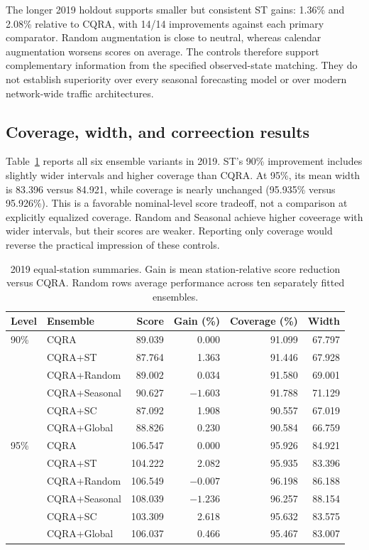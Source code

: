 \documentclass[11pt]{article}
\begin{document}
The longer 2019 holdout supports smaller but consistent ST gains: 1.36\% and 2.08\% relative to CQRA, with 14/14 improvements against each primary comparator. Random augmentation is close to neutral, whereas calendar augmentation worsens scores on average. The controls therefore support complementary information from the specified observed-state matching. They do not establish superiority over every seasonal forecasting model or over modern network-wide traffic architectures.

\subsection{Coverage, width, and correection results}
Table~\ref{tab:metrics} reports all six ensemble variants in 2019. ST's 90\% improvement includes slightly wider intervals and higher coverage than CQRA. At 95\%, its mean width is 83.396 versus 84.921, while coverage is nearly unchanged (95.935\% versus 95.926\%). This is a favorable nominal-level score tradeoff, not a comparison at explicitly equalized coverage. Random and Seasonal achieve higher coveerage with wider intervals, but their scores are weaker. Reporting only coverage would reverse the practical impression of these controls.

\begin{table}[H]
\centering\small
\caption{2019 equal-station summaries. Gain is mean station-relative score reduction versus CQRA. Random rows average performance across ten separately fitted ensembles.}\label{tab:metrics}
\begin{tabular}{llrrrr}
\toprule
Level & Ensemble & Score & Gain (\%) & Coverage (\%) & Width\\
\midrule
90\% & CQRA & 89.039 & 0.000 & 91.099 & 67.797\\
 & CQRA+ST & 87.764 & 1.363 & 91.446 & 67.928\\
 & CQRA+Random & 89.002 & 0.034 & 91.580 & 69.001\\
 & CQRA+Seasonal & 90.627 & $-1.603$ & 91.788 & 71.129\\
 & CQRA+SC & 87.092 & 1.908 & 90.557 & 67.019\\
 & CQRA+Global & 88.826 & 0.230 & 90.584 & 66.759\\
95\% & CQRA & 106.547 & 0.000 & 95.926 & 84.921\\
 & CQRA+ST & 104.222 & 2.082 & 95.935 & 83.396\\
 & CQRA+Random & 106.549 & $-0.007$ & 96.198 & 86.188\\
 & CQRA+Seasonal & 108.039 & $-1.236$ & 96.257 & 88.154\\
 & CQRA+SC & 103.309 & 2.618 & 95.632 & 83.575\\
 & CQRA+Global & 106.037 & 0.466 & 95.467 & 83.007\\
\bottomrule
\end{tabular}
\end{table}
\end{document}
